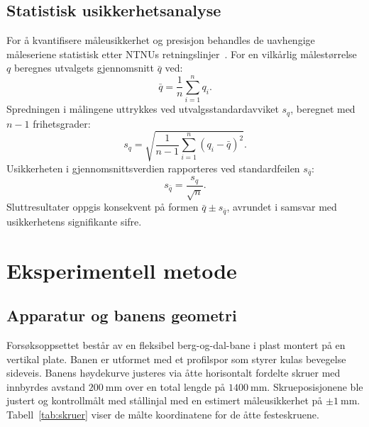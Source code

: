 \documentclass[11pt,a4paper]{article}
\begin{document}
\subsection{Statistisk usikkerhetsanalyse}
For å kvantifisere måleusikkerhet og presisjon behandles de uavhengige måleseriene statistisk etter NTNUs retningslinjer~\cite{lilledahl2017}. For en vilkårlig målestørrelse $q$ beregnes utvalgets gjennomsnitt $\bar{q}$ ved:
\begin{equation}
    \bar{q} = \frac{1}{n} \sum_{i=1}^n q_i.
    \label{eq:mean}
\end{equation}
Spredningen i målingene uttrykkes ved utvalgsstandardavviket $s_q$, beregnet med $n - 1$ frihetsgrader:
\begin{equation}
    s_q = \sqrt{\frac{1}{n - 1} \sum_{i=1}^n \left(q_i - \bar{q}\right)^2}.
    \label{eq:std}
\end{equation}
Usikkerheten i gjennomsnittsverdien rapporteres ved standardfeilen $s_{\bar{q}}$:
\begin{equation}
    s_{\bar{q}} = \frac{s_q}{\sqrt{n}}.
    \label{eq:sem}
\end{equation}
Sluttresultater oppgis konsekvent på formen $\bar{q} \pm s_{\bar{q}}$, avrundet i samsvar med usikkerhetens signifikante sifre.

\section{Eksperimentell metode}

\subsection{Apparatur og banens geometri}
Forsøksoppsettet består av en fleksibel berg-og-dal-bane i plast montert på en vertikal plate. Banen er utformet med et profilspor som styrer kulas bevegelse sideveis. Banens høydekurve justeres via åtte horisontalt fordelte skruer med innbyrdes avstand $\SI{200}{\milli\meter}$ over en total lengde på $\SI{1400}{\milli\meter}$. Skrueposisjonene ble justert og kontrollmålt med stållinjal med en estimert måleusikkerhet på $\pm\SI{1}{\milli\meter}$. Tabell~\ref{tab:skruer} viser de målte koordinatene for de åtte festeskruene.
\end{document}
